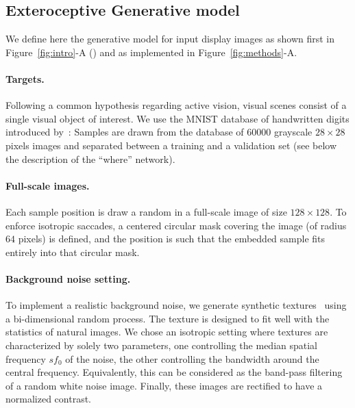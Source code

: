 \subsection{Exteroceptive Generative model}
We define here the generative model for input display images as shown first in Figure~\ref{fig:intro}-A (\DIS ) and as implemented in Figure~\ref{fig:methods}-A.

\paragraph{Targets.} Following a common hypothesis regarding active vision, visual scenes consist of a single visual object of interest. We use the MNIST database of handwritten digits introduced by~\citet{Lecun1998}: %
Samples are drawn from the database of $60000$ grayscale $28\times 28$ pixels images and separated between a training and a validation set (see below the description of the ``where'' network).

\paragraph{Full-scale images.} Each sample position is draw a random in a full-scale image of size $128\times 128$. To enforce isotropic saccades, a centered circular mask covering the image (of radius $64$ pixels) is defined, and the position is such that the embedded sample fits entirely into that circular mask.

\paragraph{Background noise setting.} To implement a realistic background noise, we generate synthetic textures~\citep{Sanz12} using a bi-dimensional random process. %
The texture is designed to fit well with the statistics of natural images. We chose an isotropic setting where textures are characterized by solely two parameters, one controlling the median spatial frequency $sf_0$ of the noise, the other controlling the bandwidth around the central frequency. Equivalently, this can be considered as the band-pass filtering of a random white noise image. Finally, these images are rectified to have a normalized contrast.

